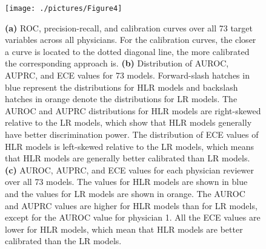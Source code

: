 \begin{table}[htbp]
    \centering
    \setlength{\aboverulesep}{0.1pt}
    \setlength{\belowrulesep}{0.1pt}
    \renewcommand{\arraystretch}{1.2}
    \caption{Overall AUROC, AUPRC, and ECE for LR and HLR models over all 73 target variables and across all physicians. Higher AUROC and AUPRC show better discrimination power while lower ECE denotes better probability calibration. The best values for each metric are in boldface.}
    \label{tab:overall}
    \vspace{3mm}
    \centering
\end{table}


\begin{figure}[!h]
    \centering
    \texttt{[image: ./pictures/Figure4]}
    \caption{
    \textbf{(a)} ROC, precision-recall, and calibration curves over all 73 target variables across all physicians. For the calibration curves, the closer a curve is located to the dotted diagonal line, the more calibrated the corresponding approach is. \textbf{(b)} Distribution of AUROC, AUPRC, and ECE values for 73 models. Forward-slash hatches in blue represent the distributions for HLR models and backslash hatches in orange denote the distributions for LR models. The AUROC and AUPRC distributions for HLR models are right-skewed relative to the LR models, which show that HLR models generally have better discrimination power. The distribution of ECE values of HLR models is left-skewed relative to the LR models, which means that HLR models are generally better calibrated than LR models. \textbf{(c)} AUROC, AUPRC, and ECE values for each physician reviewer over all 73 models. The values for HLR models are shown in blue and the values for LR models are shown in orange. The AUROC and AUPRC values are higher for HLR models than for LR models, except for the AUROC value for physician 1. All the ECE values are lower for HLR models, which mean that HLR models are better calibrated than the LR models.
    }\label{fig:4}
\end{figure}


